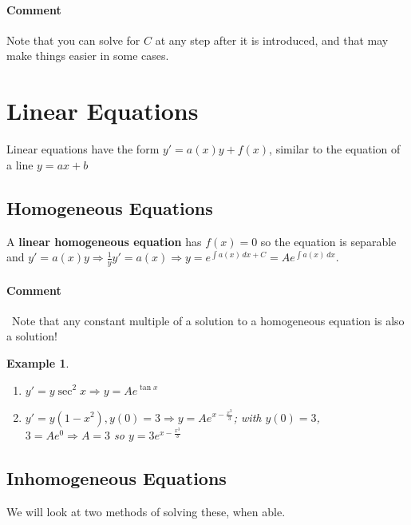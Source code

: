 \documentclass[letterpaper, 11pt, openany]{book}
\theoremstyle{mytheoremstyle}
\theoremstyle{myexamplestyle}
\newtheorem{example}{Example}[section]
\newenvironment{commentary}{\paragraph{\sffamily \smaller \fontseries{b}\selectfont Comment}}{}
\begin{document}
\begin{commentary}
    Note that you can solve for \(C\) at any step after it is introduced, and that may make things easier in some cases.
\end{commentary}
\section{Linear Equations}
\setcounter{figure}{0}

Linear equations have the form \(y' = a(x) y + f(x)\), similar to the equation of a line \(y = ax + b\)

\subsection{Homogeneous Equations}
A \textbf{linear homogeneous equation} has \(f(x) = 0\) so the equation is separable \faSmile \, and \(y' = a(x)y \Rightarrow \frac{1}{y} y' = a(x) \Rightarrow y = e^{\int a(x) \, dx + C} = Ae^{\int a(x) \, dx}\). 
\begin{commentary}
     \faLightbulb \, Note that any constant multiple of a solution to a homogeneous equation is also a solution!
\end{commentary}

\begin{example}\label{de-lin-hmgns}
    \begin{enumerate}
        \item \(y' = y \sec^{2} x \Rightarrow y = A e^{\tan x}\)
        \item \(y' = y (1-x^2), y(0) = 3 \Rightarrow y = A e^{x-\frac{x^{3}}{3}}\); with \(y(0) = 3\), \(3 = Ae^{0} \Rightarrow A = 3\) so \(y = 3 e^{x-\frac{x^{3}}{3}}\)
    \end{enumerate}
\end{example}

\subsection{Inhomogeneous Equations}
We will look at two methods of solving these, when able.
\end{document}
